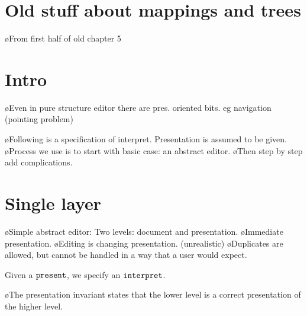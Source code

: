 %																
%																
%																
\section{Old stuff about mappings and trees}

\bl
\o From first half of old chapter 5
\el



%																
%																
%																
\section{Intro}

\bl
\o Even in pure structure editor there are pres. oriented bits. eg navigation (pointing problem)
\el

\bl
\o Following is a specification of interpret. Presentation is assumed to be given.
\o Process we use is to start with basic case: an abstract editor. 
\o Then step by step add complications.
\el



%																
%																
%																
\section{Single layer}

\bl
\o Simple abstract editor: Two levels: document and presentation.
\o Immediate presentation.
\o Editing is changing presentation. (unrealistic)
\o Duplicates are allowed, but cannot be handled in a way that a user would expect.
\el


Given a ${\tt present}$, we specify an ${\tt interpret}$.




\bl
\o The presentation invariant states that the lower level is a correct presentation of the higher level.
\el

